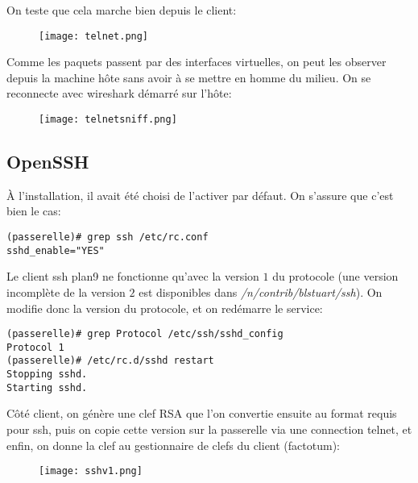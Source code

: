 On teste que cela marche bien depuis le client:
\begin{figure}[!ht]
	\centering
	\texttt{[image: telnet.png]}
\end{figure}

Comme les paquets passent par des interfaces virtuelles, on
peut les observer depuis la machine hôte sans avoir à se
mettre en homme du milieu. On se reconnecte avec wireshark
démarré sur l'hôte:
\begin{figure}[!ht]
	\centering
	\texttt{[image: telnetsniff.png]}
\end{figure}

\subsection{OpenSSH}
À l'installation, il avait été choisi de l'activer par défaut. On
s'assure que c'est bien le cas:
\begin{verbatim}
(passerelle)# grep ssh /etc/rc.conf 
sshd_enable="YES"
\end{verbatim}

Le client ssh plan9 ne fonctionne qu'avec la version $1$ du
protocole (une version incomplète de la version $2$ est
disponibles dans \textit{/n/contrib/blstuart/ssh}). On modifie
donc la version du protocole, et on redémarre le service:
\begin{verbatim}
(passerelle)# grep Protocol /etc/ssh/sshd_config
Protocol 1
(passerelle)# /etc/rc.d/sshd restart
Stopping sshd.
Starting sshd.
\end{verbatim}

Côté client, on génère une clef RSA que l'on convertie ensuite
au format requis pour ssh, puis on copie cette version sur la
passerelle via une connection telnet, et enfin, on donne la
clef au gestionnaire de clefs du client (factotum):
\begin{figure}[!ht]
	\centering
	\texttt{[image: sshv1.png]}
\end{figure}

